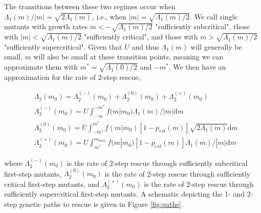 \documentclass[9pt,twocolumn,twoside,lineno]{gsajnl}
\begin{document}
The transitions between these two regimes occur when $\Lambda_1(m)/ |m| = \sqrt{2\Lambda_1(m)}$, i.e., when $|m| = \sqrt{\Lambda_1(m)/2}$.
We call single mutants with growth rates $m < -\sqrt{\Lambda_1(m)/2}$ "sufficiently subcritical", those with $|m| < \sqrt{\Lambda_1(m)/2}$ "sufficiently critical", and those with $m > \sqrt{\Lambda_1(m)/2}$ "sufficiently supercritical".
Given that $U$ and thus $\Lambda_1(m)$ will generally be small, $m$ will also be small at these transition points, meaning we can approximate them with $m^* = \sqrt{\Lambda_1(0)/2}$ and $-m^*$.
We then have an approximation for the rate of 2-step rescue, 

\begin{equation}\label{eq:p2tilde}
\begin{aligned}
&\Lambda_2(m_0) = \Lambda_2^{(-)}(m_0) + \Lambda_2^{(0)}(m_0) + \Lambda_2^{(+)}(m_0)\\
& \Lambda_2^{(-)}(m_0) = U \int_{-\infty}^{-m^*} f(m|m_0)  \Lambda_1(m)/ |m| \mathrm{d}m\\
& \Lambda_2^{(0)}(m_0) = U \int_{-m^*}^{m^*} f(m|m_0) \left[ 1 - p_{est}(m) \right] \sqrt{2\Lambda_1(m)} \mathrm{d}m\\
& \Lambda_2^{(+)}(m_0) = U \int_{m^*}^{m_{max}} f(m|m_0) \left[ 1 - p_{est}(m) \right] \Lambda_1(m)/ |m| \mathrm{d}m
\end{aligned}
\end{equation}

\noindent where $\Lambda_2^{(-)}(m_0)$ is the rate of 2-step rescue through sufficiently subcritical first-step mutants, $\Lambda_2^{(0)}(m_0)$ is the rate of 2-step rescue through sufficiently critical first-step mutants, and $\Lambda_2^{(+)}(m_0)$ is the rate of 2-step rescue through sufficiently supercritical first-step mutants.
A schematic depicting the 1- and 2-step genetic paths to rescue is given in Figure \ref{fig:paths}.
\end{document}
